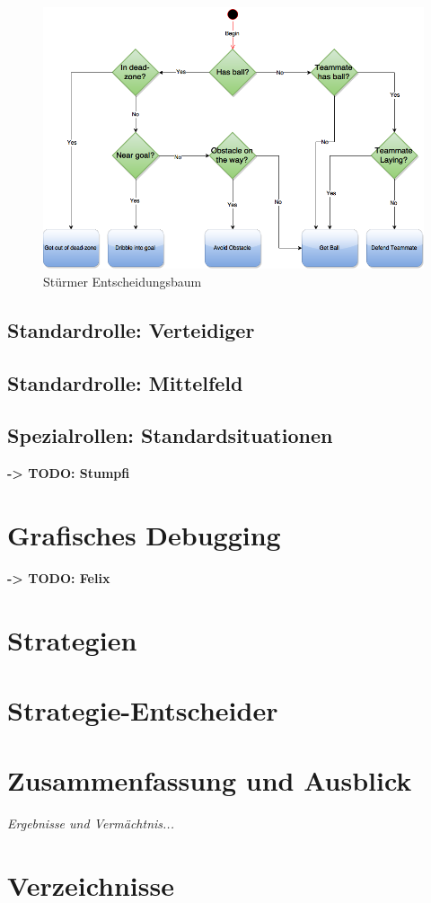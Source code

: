 \documentclass[fontsize=12pt,a4paper,final]{scrartcl}[2003/01/01]
\makeatletter
\def\ScaleIfNeeded{%
	\ifdim\Gin@nat@width>\linewidth
		\linewidth
	\else
		\Gin@nat@width
	\fi
}
\makeatother
\begin{document}
\begin{figure}[H]
	\centering
	\includegraphics[width=\ScaleIfNeeded]{Grafiken/KI/attackerCenter_v2}
	\caption{Stürmer Entscheidungsbaum}
	\label{Stürmer Entscheidungsbaum}
\end{figure}

\subsection{Standardrolle: Verteidiger}
\subsection{Standardrolle: Mittelfeld}

\subsection{Spezialrollen: Standardsituationen}
\textbf{-> TODO: Stumpfi}
\section{Grafisches Debugging}\label{se:Grafisches Debugging}
\textbf{-> TODO: Felix}

\section{Strategien}

\section{Strategie-Entscheider}

\section{Zusammenfassung und Ausblick}
\textit{Ergebnisse und Vermächtnis...}

\section{Verzeichnisse}
\listoffigures

\lstlistoflistings 
\end{document}
